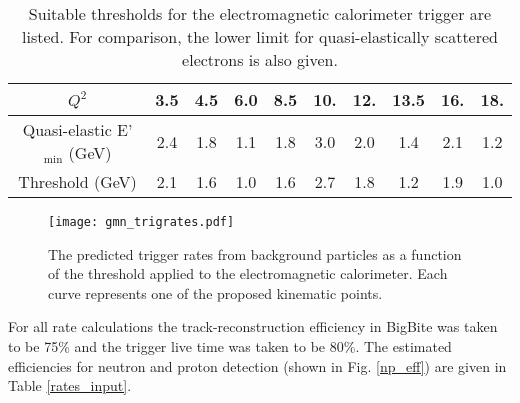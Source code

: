 \documentclass[12pt,letterpaper,oneside]{article}
\begin{document}
\begin{table}
\begin{center}
\caption{Suitable thresholds for the electromagnetic calorimeter
  trigger are listed.  For comparison, the lower limit for
  quasi-elastically scattered electrons is also given.
}
\label{thresholds}
\vspace{.2in}
{\begin{tabular}{|c|c|c|c|c|c|c|c|c|c|}
\hline
$Q^2$&3.5& 4.5&6.0& 8.5&10.&12.&13.5&16.&18.\\
\hline
\hline
Quasi-elastic E'$_{\mbox{min}}$ (GeV)&2.4&1.8&1.1&1.8&3.0&2.0&1.4&2.1&1.2\\
\hline
Threshold (GeV)&2.1&1.6&1.0&1.6&2.7&1.8&1.2&1.9&1.0\\
\hline
\end{tabular}}
\end{center}
\end{table}




\begin{figure}
\texttt{[image: gmn\_trigrates.pdf]}\\
\caption{\label{trig_rates}
The predicted trigger rates from background particles as a function of
the threshold applied to the electromagnetic calorimeter.  Each curve
represents one of the proposed kinematic points.
}
\end{figure}




For all rate calculations  the 
track-reconstruction efficiency in BigBite was taken to be 75\% and
the trigger live time was taken to be 80\%.  
The estimated efficiencies for neutron and proton detection (shown in
Fig. \ref{np_eff}) are given in Table \ref{rates_input}.  
\end{document}
